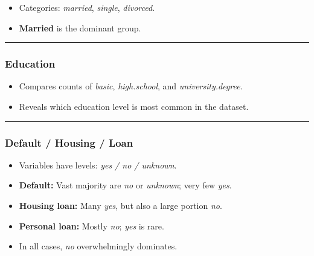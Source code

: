 \documentclass[
]{article}
\providecommand{\tightlist}{%
  \setlength{\itemsep}{0pt}\setlength{\parskip}{0pt}}
\begin{document}
\begin{itemize}
\tightlist
\item
  Categories: \emph{married}, \emph{single}, \emph{divorced}.\\
\item
  \textbf{Married} is the dominant group.
\end{itemize}

\begin{center}\rule{0.5\linewidth}{0.5pt}\end{center}

\subsubsection{Education}\label{education}

\begin{itemize}
\tightlist
\item
  Compares counts of \emph{basic}, \emph{high.school}, and
  \emph{university.degree}.\\
\item
  Reveals which education level is most common in the dataset.
\end{itemize}

\begin{center}\rule{0.5\linewidth}{0.5pt}\end{center}

\subsubsection{Default / Housing / Loan}\label{default-housing-loan}

\begin{itemize}
\tightlist
\item
  Variables have levels: \emph{yes / no / unknown}.\\
\item
  \textbf{Default:} Vast majority are \emph{no} or \emph{unknown}; very
  few \emph{yes}.\\
\item
  \textbf{Housing loan:} Many \emph{yes}, but also a large portion
  \emph{no}.\\
\item
  \textbf{Personal loan:} Mostly \emph{no}; \emph{yes} is rare.\\
\item
  In all cases, \emph{no} overwhelmingly dominates.
\end{itemize}
\end{document}
